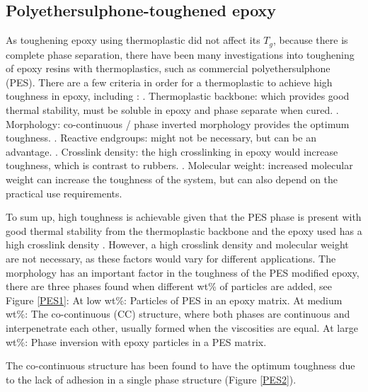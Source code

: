 \documentclass[numbers=noendperiod,chapterprefix=on]{icldt} %
\begin{document}
\subsection{Polyethersulphone-toughened epoxy}

As toughening epoxy using thermoplastic did not affect its $ T_{g} $, because there is complete phase separation, there have been many investigations into toughening of epoxy resins with thermoplastics, such as commercial polyethersulphone (PES). \newline
There are a few criteria in order for a thermoplastic to achieve high toughness in epoxy, including \cite{Hodgkin1998}:
. Thermoplastic backbone: which provides good thermal stability, must be soluble in epoxy and phase separate when cured.
. Morphology: co-continuous / phase inverted morphology provides the optimum toughness.
. Reactive endgroups: might not be necessary, but can be an advantage.
. Crosslink density: the high crosslinking in epoxy would increase toughness, which is contrast to rubbers.
. Molecular weight: increased molecular weight can increase the toughness of the system, but can also depend on the practical use requirements.
\newline

To sum up, high toughness is achievable given that the PES phase is present with good thermal stability from the thermoplastic backbone and the epoxy used has a high crosslink density \cite{Hodgkin1998}.  However, a high crosslink density and molecular weight are not necessary, as these factors would vary for different applications.
The morphology has an important factor in the toughness of the PES modified epoxy, there are three phases found when different wt\% of particles are added, see Figure \ref{PES1}:\newline
At low wt\%: Particles of PES in an epoxy matrix.
\newline
At medium wt\%: The co-continuous (CC) structure, where both phases are continuous and interpenetrate each other, usually formed when the viscosities are equal. 
\newline
At large wt\%: Phase inversion with epoxy particles in a PES matrix.

The co-continuous structure has been found to have the optimum toughness \cite{Chen2012,Hodgkin1998} due to the lack of adhesion in a single phase structure (Figure \ref{PES2}). 
\end{document}
